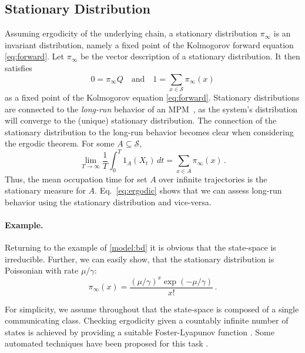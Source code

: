 \subsection{Stationary Distribution}\label{sec:statagg:stationary_dist}
Assuming
ergodicity  
of the underlying chain, a stationary distribution $\pi_{\infty}$ is an invariant distribution, namely a fixed point of the Kolmogorov forward equation \eqref{eq:forward}.
Let $\pi_{\infty}$ be the vector description of a stationary distribution. It then  satisfies
\begin{equation}\label{eq:stationary}
0=\pi_{\infty}Q\quad\text{and}\quad 1=\sum_{x\in\mathcal{S}}\pi_{\infty}(x)
\end{equation}
as a fixed point of the Kolmogorov equation \eqref{eq:forward}.
Stationary distributions are connected to the \emph{long-run} behavior of an \ac{MPM}~\cite{dayar2011bounding}, as the system's distribution will converge to the (unique)
stationary distribution.
The connection of the stationary distribution to the long-run behavior becomes clear when considering the ergodic theorem. 
For some $A\subseteq\mathcal{S}$,
\begin{equation}\label{eq:ergodic}
    \lim_{T\to\infty}\frac{1}{T}\int_0^T 1_A(X_t)\,dt
    = \sum_{x\in A}\pi_{\infty}(x)\,.
\end{equation}
Thus, the mean occupation time for set $A$ over infinite trajectories is the stationary measure for $A$.
Eq.~\eqref{eq:ergodic} shows that we can assess long-run behavior using the stationary distribution and vice-versa.

\paragraph{Example.} Returning to the example of \autoref{model:bd} it is obvious that the state-space is irreducible.
Further, we can easily show, that the stationary distribution is Poissonian with rate $\mu/\gamma$:
$$ \pi_{\infty}(x)=\frac{{(\mu/\gamma)}^{x}\exp(-\mu/\gamma)}{x!}\,.$$


For simplicity, we assume throughout that the state-space is composed of a single communicating class.
Checking ergodicity given a countably infinite number of states is achieved by providing a suitable Foster-Lyapunov function \cite{meyn2012markov}.
Some automated techniques have been proposed for this task \cite{dayar2011bounding,gupta2014scalable,milias2014optimization}.



